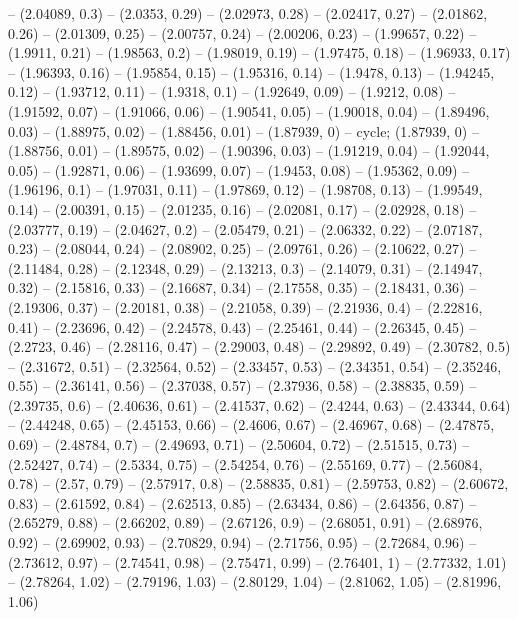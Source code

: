 -- (2.04089, 0.3)
-- (2.0353, 0.29)
-- (2.02973, 0.28)
-- (2.02417, 0.27)
-- (2.01862, 0.26)
-- (2.01309, 0.25)
-- (2.00757, 0.24)
-- (2.00206, 0.23)
-- (1.99657, 0.22)
-- (1.9911, 0.21)
-- (1.98563, 0.2)
-- (1.98019, 0.19)
-- (1.97475, 0.18)
-- (1.96933, 0.17)
-- (1.96393, 0.16)
-- (1.95854, 0.15)
-- (1.95316, 0.14)
-- (1.9478, 0.13)
-- (1.94245, 0.12)
-- (1.93712, 0.11)
-- (1.9318, 0.1)
-- (1.92649, 0.09)
-- (1.9212, 0.08)
-- (1.91592, 0.07)
-- (1.91066, 0.06)
-- (1.90541, 0.05)
-- (1.90018, 0.04)
-- (1.89496, 0.03)
-- (1.88975, 0.02)
-- (1.88456, 0.01)
-- (1.87939, 0)
-- cycle;
\drawBand (1.87939, 0)
-- (1.88756, 0.01)
-- (1.89575, 0.02)
-- (1.90396, 0.03)
-- (1.91219, 0.04)
-- (1.92044, 0.05)
-- (1.92871, 0.06)
-- (1.93699, 0.07)
-- (1.9453, 0.08)
-- (1.95362, 0.09)
-- (1.96196, 0.1)
-- (1.97031, 0.11)
-- (1.97869, 0.12)
-- (1.98708, 0.13)
-- (1.99549, 0.14)
-- (2.00391, 0.15)
-- (2.01235, 0.16)
-- (2.02081, 0.17)
-- (2.02928, 0.18)
-- (2.03777, 0.19)
-- (2.04627, 0.2)
-- (2.05479, 0.21)
-- (2.06332, 0.22)
-- (2.07187, 0.23)
-- (2.08044, 0.24)
-- (2.08902, 0.25)
-- (2.09761, 0.26)
-- (2.10622, 0.27)
-- (2.11484, 0.28)
-- (2.12348, 0.29)
-- (2.13213, 0.3)
-- (2.14079, 0.31)
-- (2.14947, 0.32)
-- (2.15816, 0.33)
-- (2.16687, 0.34)
-- (2.17558, 0.35)
-- (2.18431, 0.36)
-- (2.19306, 0.37)
-- (2.20181, 0.38)
-- (2.21058, 0.39)
-- (2.21936, 0.4)
-- (2.22816, 0.41)
-- (2.23696, 0.42)
-- (2.24578, 0.43)
-- (2.25461, 0.44)
-- (2.26345, 0.45)
-- (2.2723, 0.46)
-- (2.28116, 0.47)
-- (2.29003, 0.48)
-- (2.29892, 0.49)
-- (2.30782, 0.5)
-- (2.31672, 0.51)
-- (2.32564, 0.52)
-- (2.33457, 0.53)
-- (2.34351, 0.54)
-- (2.35246, 0.55)
-- (2.36141, 0.56)
-- (2.37038, 0.57)
-- (2.37936, 0.58)
-- (2.38835, 0.59)
-- (2.39735, 0.6)
-- (2.40636, 0.61)
-- (2.41537, 0.62)
-- (2.4244, 0.63)
-- (2.43344, 0.64)
-- (2.44248, 0.65)
-- (2.45153, 0.66)
-- (2.4606, 0.67)
-- (2.46967, 0.68)
-- (2.47875, 0.69)
-- (2.48784, 0.7)
-- (2.49693, 0.71)
-- (2.50604, 0.72)
-- (2.51515, 0.73)
-- (2.52427, 0.74)
-- (2.5334, 0.75)
-- (2.54254, 0.76)
-- (2.55169, 0.77)
-- (2.56084, 0.78)
-- (2.57, 0.79)
-- (2.57917, 0.8)
-- (2.58835, 0.81)
-- (2.59753, 0.82)
-- (2.60672, 0.83)
-- (2.61592, 0.84)
-- (2.62513, 0.85)
-- (2.63434, 0.86)
-- (2.64356, 0.87)
-- (2.65279, 0.88)
-- (2.66202, 0.89)
-- (2.67126, 0.9)
-- (2.68051, 0.91)
-- (2.68976, 0.92)
-- (2.69902, 0.93)
-- (2.70829, 0.94)
-- (2.71756, 0.95)
-- (2.72684, 0.96)
-- (2.73612, 0.97)
-- (2.74541, 0.98)
-- (2.75471, 0.99)
-- (2.76401, 1)
-- (2.77332, 1.01)
-- (2.78264, 1.02)
-- (2.79196, 1.03)
-- (2.80129, 1.04)
-- (2.81062, 1.05)
-- (2.81996, 1.06)
